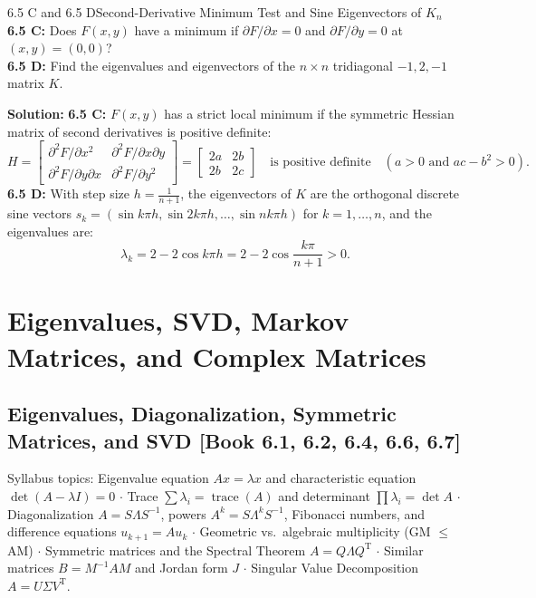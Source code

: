 \documentclass[11pt,a4paper,openany,oneside]{book}
\def\vect#1{#1}%
\def\mathbf#1{#1}%
\def\bk#1{ [Book #1]}%
\newcommand{\vect}[1]{\mathbf{#1}}
\newcommand{\T}{\mathrm{T}}
\numberwithin{equation}{chapter}
\newcommand{\bk}[1]{\texorpdfstring{\enspace{\normalfont\small\color{slate}[Book #1]}}{ [Book #1]}}
\begin{document}
\begin{example}{6.5 C and 6.5 D}{Second-Derivative Minimum Test and Sine Eigenvectors of $K_n$}
\textbf{6.5 C:} Does $F(x,y)$ have a minimum if $\partial F/\partial x = 0$ and $\partial F/\partial y = 0$ at $(x,y) = (0,0)$?\\
\textbf{6.5 D:} Find the eigenvalues and eigenvectors of the $n\times n$ tridiagonal $-1, 2, -1$ matrix $K$.
\end{example}
\textbf{Solution:}
\textbf{6.5 C:} $F(x,y)$ has a strict local minimum if the symmetric Hessian matrix of second derivatives is positive definite:
\[
H = \begin{bmatrix} \partial^2 F/\partial x^2 & \partial^2 F/\partial x\partial y \\ \partial^2 F/\partial y\partial x & \partial^2 F/\partial y^2 \end{bmatrix} = \begin{bmatrix} 2a & 2b \\ 2b & 2c \end{bmatrix} \quad \text{is positive definite} \quad (a > 0 \text{ and } ac - b^2 > 0).
\]
\textbf{6.5 D:} With step size $h = \frac{1}{n+1}$, the eigenvectors of $K$ are the orthogonal discrete sine vectors $\vect{s}_k = (\sin k\pi h, \sin 2k\pi h, \dots, \sin nk\pi h)$ for $k = 1, \dots, n$, and the eigenvalues are:
\[
\lambda_k = 2 - 2\cos k\pi h = 2 - 2\cos\frac{k\pi}{n+1} > 0.
\]

\part{Eigenvalues, SVD, Markov Matrices, and Complex Matrices}

\chapter[Eigenvalues, Diagonalization, Symmetric Matrices, SVD (6.1--6.7)]{Eigenvalues, Diagonalization, Symmetric Matrices, and SVD\bk{6.1, 6.2, 6.4, 6.6, 6.7}}

\begin{syll}
Syllabus topics: Eigenvalue equation $A\vect{x} = \lambda\vect{x}$ and characteristic equation $\det(A-\lambda I) = 0$ $\cdot$ Trace $\sum \lambda_i = \operatorname{trace}(A)$ and determinant $\prod \lambda_i = \det A$ $\cdot$ Diagonalization $A = S\Lambda S^{-1}$, powers $A^k = S\Lambda^k S^{-1}$, Fibonacci numbers, and difference equations $\vect{u}_{k+1} = A\vect{u}_k$ $\cdot$ Geometric vs.\ algebraic multiplicity (GM $\le$ AM) $\cdot$ Symmetric matrices and the Spectral Theorem $A = Q\Lambda Q^\T$ $\cdot$ Similar matrices $B = M^{-1}AM$ and Jordan form $J$ $\cdot$ Singular Value Decomposition $A = U\Sigma V^\T$.
\end{syll}
\end{document}

